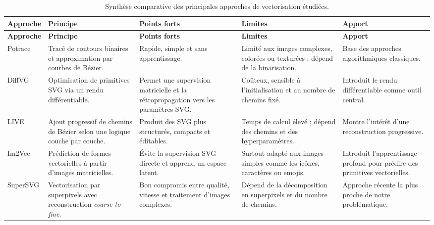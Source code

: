 \documentclass[12pt, a4paper, oneside]{report}
\begin{document}
\begingroup
\footnotesize
\setlength{\tabcolsep}{3pt}
\renewcommand{\arraystretch}{1.15}
\setlength{\arrayrulewidth}{0.4pt}

\begin{longtable}{
    |p{1.7cm}
    |p{2.7cm}
    |p{2.6cm}
    |p{3.0cm}
    |p{3.0cm}|
}
\caption{Synthèse comparative des principales approches de vectorisation étudiées.}
\label{tab:synthese_vectorisation}\\

\hline
\textbf{Approche} &
\textbf{Principe} &
\textbf{Points forts} &
\textbf{Limites} &
\textbf{Apport} \\
\hline
\endfirsthead

\hline
\textbf{Approche} &
\textbf{Principe} &
\textbf{Points forts} &
\textbf{Limites} &
\textbf{Apport} \\
\hline
\endhead

Potrace &
Tracé de contours binaires et approximation par courbes de Bézier. &
Rapide, simple et sans apprentissage. &
Limité aux images complexes, colorées ou texturées ; dépend de la binarisation. &
Base des approches algorithmiques classiques. \\
\hline

DiffVG &
Optimisation de primitives SVG via un rendu différentiable. &
Permet une supervision matricielle et la rétropropagation vers les paramètres SVG. &
Coûteux, sensible à l'initialisation et au nombre de chemins fixé. &
Introduit le rendu différentiable comme outil central. \\
\hline

LIVE &
Ajout progressif de chemins de Bézier selon une logique couche par couche. &
Produit des SVG plus structurés, compacts et éditables. &
Temps de calcul élevé ; dépend des chemins et des hyperparamètres. &
Montre l'intérêt d'une reconstruction progressive. \\
\hline

Im2Vec &
Prédiction de formes vectorielles à partir d'images matricielles. &
Évite la supervision SVG directe et apprend un espace latent. &
Surtout adapté aux images simples comme les icônes, caractères ou emojis. &
Introduit l'apprentissage profond pour prédire des primitives vectorielles. \\
\hline

SuperSVG &
Vectorisation par superpixels avec reconstruction \textit{coarse-to-fine}. &
Bon compromis entre qualité, vitesse et traitement d'images complexes. &
Dépend de la décomposition en superpixels et du nombre de chemins. &
Approche récente la plus proche de notre problématique. \\
\hline

\end{longtable}
\endgroup
\end{document}
